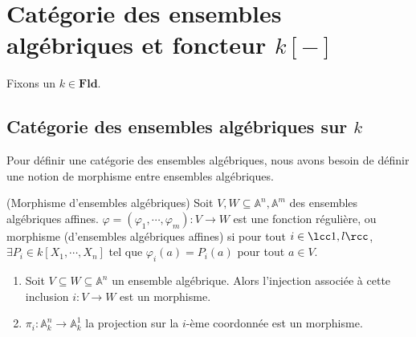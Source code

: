 \chapter{Catégorie des ensembles algébriques et foncteur $k[-]$}
    Fixons un $k \in \mathbf{Fld}$.
    \section{Catégorie des ensembles algébriques sur $k$}
        Pour définir une catégorie des ensembles algébriques, nous avons besoin de définir une notion de morphisme entre ensembles algébriques.


        \begin{defi} (Morphisme d'ensembles algébriques)
            \label{ensalgmor}
            Soit $V,W \subseteq \mathbb{A}^n, \mathbb{A}^m$ des ensembles algébriques affines. $\varphi = (\varphi_1, \cdots, \varphi_m) : V \to W$ est une fonction régulière, ou morphisme (d'ensembles algébriques affines) si pour tout $i \in \lcc 1,l \rcc$, $\exists P_i \in k[X_1, \cdots, X_n]$ tel que $\varphi_i(a) = P_i(a)$ pour tout $a \in V$.
        \end{defi}

        \begin{expl}
            \begin{enumerate}
                \item Soit $V \subseteq W \subseteq \mathbb{A}^n$ un ensemble algébrique. Alors l'injection associée à cette inclusion $i : V \to W$ est un morphisme.
                \item $\pi_i : \mathbb{A}^n_k \to \mathbb{A}_k^1$ la projection sur la $i$-ème coordonnée est un morphisme.
            \end{enumerate}
        \end{expl}

